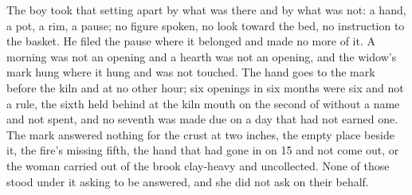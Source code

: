 The boy took that setting apart by what was there and by what was not: a hand, a pot, a rim, a pause; no figure spoken, no look toward the bed, no instruction to the basket. He filed the pause where it belonged and made no more of it. A morning was not an opening and a hearth was not an opening, and the widow's mark hung where it hung and was not touched. The hand goes to the mark before the kiln and at no other hour; six openings in six months were six and not a rule, the sixth held behind at the kiln mouth on the second of  without a name and not spent, and no seventh was made due on a day that had not earned one. The mark answered nothing for the crust at two inches, the empty place beside it, the fire's missing fifth, the hand that had gone in on  15 and not come out, or the woman carried out of the brook clay-heavy and uncollected. None of those stood under it asking to be answered, and she did not ask on their behalf.

\scenebreak

